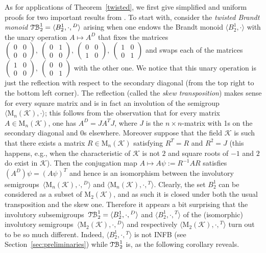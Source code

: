 \documentclass[smallextended]{svjour3}
\newcommand{\sgp}{semi\-group}
\newcommand{\sgps}{semi\-groups}
\newcommand{\iss}{involutory semi\-groups}
\newcommand{\TB}{\ensuremath{\mathcal{T\kern-.5pt B}_2^1}}
\begin{document}
As for applications of Theorem~\ref{twisted}, we first give simplified and uniform proofs for two important results from \cite{ADV:2012}.
To start with, consider the \emph{twisted Brandt monoid} $\TB=\langle B_2^1,\cdot,{}^D\rangle$ arising when one endows the Brandt monoid
$\langle B_2^1,\cdot\rangle$ with the unary operation $A\mapsto A^D$ that fixes the matrices $\left(\begin{smallmatrix} 0 & 0\\ 0 &
0\end{smallmatrix}\right),\ \left(\begin{smallmatrix} 0 & 1\\ 0 & 0\end{smallmatrix}\right),\ \left(\begin{smallmatrix} 0 & 0\\ 1 &
0\end{smallmatrix}\right),\ \left(\begin{smallmatrix} 1 & 0\\ 0 & 1\end{smallmatrix}\right)$ and swaps each of the matrices
$\left(\begin{smallmatrix}1 & 0\\ 0 & 0\end{smallmatrix}\right),\ \left(\begin{smallmatrix} 0 & 0\\ 0 & 1\end{smallmatrix}\right)$ with the
other one. We notice that this unary operation is just the reflection with respect to the secondary diagonal (from the top right to the
bottom left corner). The reflection (called the \emph{skew transposition}) makes sense for every square matrix and is in fact an involution
of the \sgp\ $\langle\mathrm{M}_n(\mathcal{K}),\cdot\rangle$; this follows from the observation that for every matrix
$A\in\mathrm{M}_n(\mathcal{K})$, one has $A^D=JA^TJ$, where $J$ is the $n\times n$-matrix with 1s on the secondary diagonal and 0s
elsewhere. Moreover suppose that the field $\mathcal{K}$ is such that there exists a matrix $R\in\mathrm{M}_n(\mathcal{K})$ satisfying
$R^T=R$ and $R^2=J$ (this happens, e.g., when the characteristic of $\mathcal{K}$ is not  $2$ and  square roots of ${-1}$ and ${2}$ do
exist in $\mathcal{K}$). Then the conjugation map $A\mapsto A\psi:= R^{-1}AR$ satisfies $(A^D)\psi=(A\psi)^T$ and hence is an isomorphism
between the \iss\ $\langle\mathrm{M}_n(\mathcal{K}),\cdot,{}^D\rangle$ and $\langle\mathrm{M}_n(\mathcal{K}),\cdot,{}^T\rangle$. Clearly,
the set $B_2^1$ can be considered as a subset of $\mathrm{M}_2(\mathcal{K})$, and as such it is closed under both the usual transposition
and the skew one. Therefore it appears a bit surprising that the involutory sub\sgps\ $\TB=\langle B_2^1,\cdot,{}^D\rangle$ and $\langle
B_2^1,\cdot,{}^T\rangle$ of the (isomorphic) \iss\ $\langle\mathrm{M}_2(\mathcal{K}),\cdot,{}^D\rangle$ and respectively
$\langle\mathrm{M}_2(\mathcal{K}),\cdot,{}^T\rangle$ turn out to be so much different. Indeed, $\langle B_2^1,\cdot,{}^T\rangle$ is not
INFB (see Section~\ref{sec:preliminaries}) while $\TB$ is, as the following corollary reveals.
\end{document}
